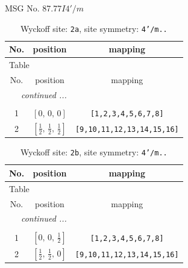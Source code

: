 \documentclass[fleqn,8pt]{jsarticle}
\begin{document}
\setcounter{MaxMatrixCols}{32}

\renewcommand{\tablename}{Table~}
\renewcommand{\figurename}{Figure~}
\begin{center}
\LARGE
MSG No. 87.77\quad$I4'/m$
\end{center}
\renewcommand{\arraystretch}{1.2}
\begin{longtable}{ccc}
\caption{Wyckoff site: {\tt 2a}, site symmetry: {\tt 4'/m..}}
 \\
 \hline \hline
No. & position & mapping \\ \hline \endfirsthead

\multicolumn{2}{l}{\tablename\ \thetable{}} \\
 \hline \hline
No. & position & mapping \\ \hline \endhead

 \hline \hline
\multicolumn{2}{r}{\footnotesize\it continued ...} \\ \endfoot

 \hline \hline
\multicolumn{2}{r}{} \\ \endlastfoot

1 & $\left[ 0,\, 0,\, 0 \right]$ & {\tt [1,2,3,4,5,6,7,8]} \\ \hline
2 & $\left[ \frac{1}{2},\, \frac{1}{2},\, \frac{1}{2} \right]$ & {\tt [9,10,11,12,13,14,15,16]} \\
\end{longtable}
\renewcommand{\arraystretch}{1.2}
\begin{longtable}{ccc}
\caption{Wyckoff site: {\tt 2b}, site symmetry: {\tt 4'/m..}}
 \\
 \hline \hline
No. & position & mapping \\ \hline \endfirsthead

\multicolumn{2}{l}{\tablename\ \thetable{}} \\
 \hline \hline
No. & position & mapping \\ \hline \endhead

 \hline \hline
\multicolumn{2}{r}{\footnotesize\it continued ...} \\ \endfoot

 \hline \hline
\multicolumn{2}{r}{} \\ \endlastfoot

1 & $\left[ 0,\, 0,\, \frac{1}{2} \right]$ & {\tt [1,2,3,4,5,6,7,8]} \\ \hline
2 & $\left[ \frac{1}{2},\, \frac{1}{2},\, 0 \right]$ & {\tt [9,10,11,12,13,14,15,16]} \\
\end{longtable}
\end{document}
